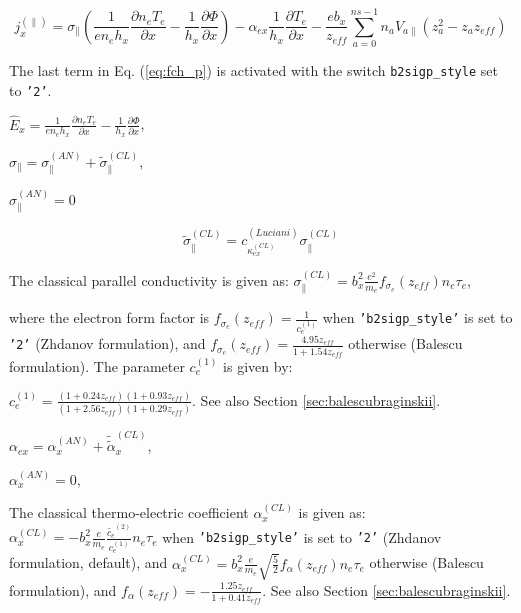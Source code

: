 \documentclass[a4paper,10pt]{report}
\begin{document}
\begin{equation}\label{eq:fch_p}
j^{(\parallel)}_x = \sigma_{\parallel} \left( \frac{1}{e n_e h_x} \frac{\partial n_e T_e}{\partial x} - \frac{1}{h_x} \frac{\partial \Phi}{\partial x} \right) - \alpha_{ex} \frac{1}{h_x} \frac{\partial T_e}{\partial x} - \frac{e b_x}{z_{eff}} \sum \limits_{a=0}^{ns-1} n_a V_{a \parallel} \left( z_a^2 - z_a z_{eff} \right)
\end{equation}

The last term in Eq. (\ref{eq:fch_p}) is activated with the switch {\tt b2sigp\_style} set to {\tt '2'}.

$\hat E_x = \frac 1{en_e h_x} \frac{\partial n_e T_e}{\partial x} - \frac 1{h_x} \frac{\partial \Phi}{\partial x}$,

$\sigma_{\parallel} = \sigma^{(AN)}_{\parallel} + \widetilde{\sigma}^{(CL)}_{\parallel}$,

$\sigma^{(AN)}_{\parallel} = 0$

\begin{equation*}
\widetilde{\sigma}^{(CL)}_{\parallel} = c_{\kappa_{ex}^{(CL)}}^{(Luciani)} \sigma^{(CL)}_{\parallel}
\end{equation*}

The classical parallel conductivity is given as:
$\sigma^{(CL)}_{\parallel} = b_x^2 \frac{e^2}{m_e} f_{\sigma_e} \left( z_{eff} \right) n_e \tau_e$,

where the electron form factor is
$f_{\sigma_e} \left( z_{eff} \right) = \frac{1}{c_e^{(1)}}$
when {\tt 'b2sigp\_style'} is set to {\tt '2'} (Zhdanov formulation), and
$f_{\sigma_e} \left( z_{eff} \right) = \frac{4.95 z_{eff}}{1 + 1.54 z_{eff}}$
otherwise (Balescu formulation). The parameter $c_e^{(1)}$ is given by:

$c_e^{(1)} = \frac{( 1 + 0.24 z_{eff} ) ( 1 + 0.93 z_{eff} )}
                  {( 1 + 2.56 z_{eff} ) ( 1 + 0.29 z_{eff} )}$.
See also Section \ref{sec:balescubraginskii}.


$\alpha_{ex} = \alpha^{(AN)}_{x} + \widetilde{\widetilde{\alpha}}^{(CL)}_{x}$,

$\alpha^{(AN)}_{x}=0$,

The classical thermo-electric coefficient $\alpha^{(CL)}_{x}$ is given as:
$\alpha^{(CL)}_{x} = - b_x^2 \frac{e}{m_e} \frac{\widetilde{c_e}^{(2)}}{c_e^{(1)}} n_e \tau_e$
when {\tt 'b2sigp\_style'} is set to {\tt '2'} (Zhdanov formulation, default), and
$\alpha^{(CL)}_{x} = b_x^2 \frac{e}{m_e} \sqrt{\frac 5 2} f_{\alpha} \left(z_{eff} \right) n_e \tau _e$ otherwise (Balescu formulation), and
$f_{\alpha} \left( z_{eff} \right) = -\frac{1.25 z_{eff}}{1 + 0.41 z_{eff}}$.
See also Section \ref{sec:balescubraginskii}.
\end{document}
